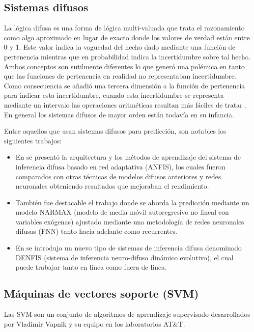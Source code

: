 \documentclass{llncs}
\begin{document}
\subsection{Sistemas difusos}
La lógica difusa es una forma de lógica multi-valuada que trata el razonamiento como algo aproximado en lugar de exacto donde los valores de verdad están entre 0 y 1. Este valor indica la vaguedad del hecho dado mediante una función de pertenencia mientras que en probabilidad indica la incertidumbre sobre tal hecho. Ambos conceptos son sutilmente diferentes lo que generó una polémica en tanto que las funciones de pertenencia en realidad no representaban incertidumbre. Como consecuencia se añadió una tercera dimensión a la función de pertenencia para indicar esta incertidumbre, cuando esta incertidumbre se representa mediante un intervalo las operaciones aritméticas resultan más fáciles de tratar \cite{liang2000interval}. En general los sistemas difusos de mayor orden están todavía en su infancia.

Entre aquellos que usan sistemas difusos para predicción, son notables los siguientes trabajos:

\begin{itemize}

\item En \cite{jang1993anfis} se presentó la arquitectura y los métodos de aprendizaje del sistema de inferencia difusa basado en red adaptativa (ANFIS), los cuales fueron comparados con otras técnicas de modelos difusos anteriores y redes neuronales obteniendo resultados que mejoraban el rendimiento.

\item También fue destacable el trabajo \cite{gao2005narmax}  donde se aborda la predicción mediante un modelo NARMAX (modelo de media móvil autoregresivo no lineal con variables exógenas) ajustado mediante una metodología de redes neuronales difusas (FNN) tanto hacia adelante como recurrentes.

\item En \cite{kasabov2002denfis} se introdujo un nuevo tipo de sistemas de inferencia difusa denominado DENFIS (sistema de inferencia neuro-difuso dinámico evolutivo), el cual puede trabajar tanto en línea como fuera de línea.

\end{itemize}

\subsection{Máquinas de vectores soporte (SVM)}
Las SVM son un conjunto de algoritmos de aprendizaje supervisado desarrollados por Vladimir Vapnik y su equipo en los laboratorios AT\&T.
\end{document}
